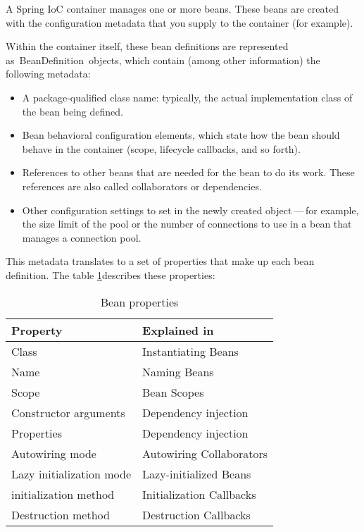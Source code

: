 A Spring IoC container manages one or more beans. These beans are created with the configuration metadata that you supply to the container (for example).

Within the container itself, these bean definitions are represented as BeanDefinition objects, which contain (among other information) the following metadata:

\begin{itemize}
  \item A package-qualified class name: typically, the actual implementation class of the bean being defined.
  \item Bean behavioral configuration elements, which state how the bean should behave in the container (scope, lifecycle callbacks, and so forth).
  \item References to other beans that are needed for the bean to do its work. These references are also called collaborators or dependencies.
  \item Other configuration settings to set in the newly created object — for example, the size limit of the pool or the number of connections to use in a bean that manages a connection pool.
\end{itemize}

This metadata translates to a set of properties that make up each bean definition. The table \ref{tab:bean-en}describes these properties:

\begin{table}[!ht]
  \centering
  \caption{Bean properties}
\label{tab:bean-en}
  \begin{tabularx}{\textwidth}{p{}<{\centering}p{}<{\centering}}
  \toprule
  Property & Explained in \\ \midrule
  Class & Instantiating Beans \\
  Name & Naming Beans \\ 
  Scope & Bean Scopes \\ 
  Constructor arguments & Dependency injection \\ 
  Properties & Dependency injection \\ 
  Autowiring mode & Autowiring Collaborators \\ 
  Lazy initialization mode & Lazy-initialized Beans \\ 
  initialization method & Initialization Callbacks \\
  Destruction method & Destruction Callbacks \\ \bottomrule
  \end{tabularx}
\end{table}


